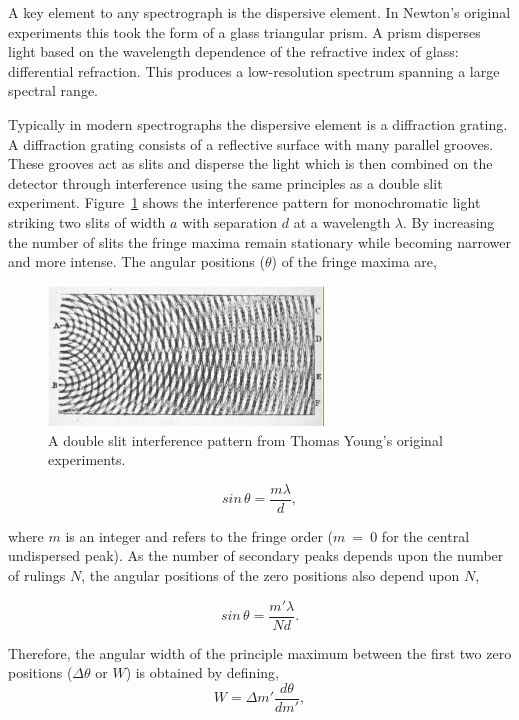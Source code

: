 A key element to any spectrograph is the dispersive element.
In Newton's original experiments this took the form of a glass triangular prism.
A prism disperses light based on the wavelength dependence of the refractive index of glass: differential refraction.
This produces a low-resolution spectrum spanning a large spectral range.

Typically in modern spectrographs the dispersive element is a diffraction grating.
A diffraction grating consists of a reflective surface with many parallel grooves.
These grooves act as slits and disperse the light which is then combined on the detector through interference using the same principles as a double slit experiment.
Figure~\ref{fig:doubleslit} shows the interference pattern for monochromatic light striking two slits of width $a$ with separation $d$ at a wavelength $\lambda$.
By increasing the number of slits the fringe maxima remain stationary while becoming narrower and more intense.
The angular positions ($\theta$) of the fringe maxima are,


\begin{figure}
 \centering
 \includegraphics[width=0.65\textwidth]{kmos/youngslits}
 \caption[Double slit interference pattern]{A double slit interference pattern from Thomas Young's original experiments.
 \label{fig:doubleslit}}
\end{figure}


\begin{equation}
    sin\,\theta = \frac{m\lambda}{d},\label{eq:a}
\end{equation}

\noindent where $m$ is an integer and refers to the fringe order ($m$~=~0 for the central undispersed peak).
As the number of secondary peaks depends upon the number of rulings $N$, the angular positions of the zero positions also depend upon $N$,

\begin{equation}
    sin\,\theta = \frac{m'\lambda}{Nd}.\label{eq:b}
\end{equation}

\noindent Therefore, the angular width of the principle maximum between the first two zero positions ($\Delta\theta$ or $W$) is obtained by defining,
\begin{equation}
     W = \Delta m'\frac{d\theta}{dm'},\label{eq:c}
\end{equation}

